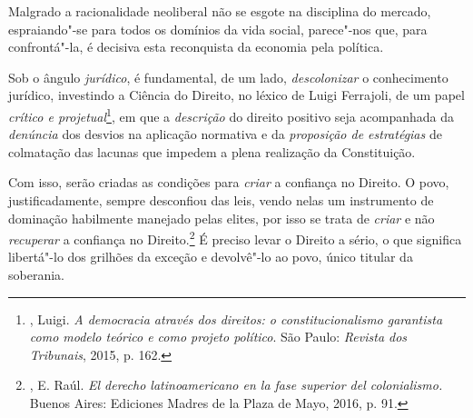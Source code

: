Malgrado a racionalidade neoliberal não se esgote na disciplina do
mercado, espraiando"-se para todos os domínios da vida social, parece"-nos
que, para confrontá"-la, é decisiva esta reconquista da economia pela
política.

Sob o ângulo \emph{jurídico}, é fundamental, de um lado,
\emph{descolonizar} o conhecimento jurídico, investindo a Ciência do
Direito, no léxico de Luigi Ferrajoli, de um papel \emph{crítico e
projetual}\footnote{, Luigi. \emph{A democracia através dos
  direitos: o constitucionalismo garantista como modelo teórico e como
  projeto político}. São Paulo: \emph{Revista dos Tribunais}, 2015, p. 162.}, em
que a \emph{descrição} do direito positivo seja acompanhada da
\emph{denúncia} dos desvios na aplicação normativa e da \emph{proposição
de estratégias} de colmatação das lacunas que impedem a plena realização
da Constituição.

Com isso, serão criadas as condições para \emph{criar} a confiança no
Direito. O povo, justificadamente, sempre desconfiou das leis, vendo
nelas um instrumento de dominação habilmente manejado pelas elites, por
isso se trata de \emph{criar} e não \emph{recuperar} a confiança no
Direito.\footnote{, E. Raúl. \emph{El derecho latinoamericano
  en la fase superior del colonialismo.} Buenos Aires: Ediciones Madres
  de la Plaza de Mayo, 2016, p. 91.} É preciso levar o Direito a sério,
o que significa libertá"-lo dos grilhões da exceção e devolvê"-lo ao povo,
único titular da soberania.
